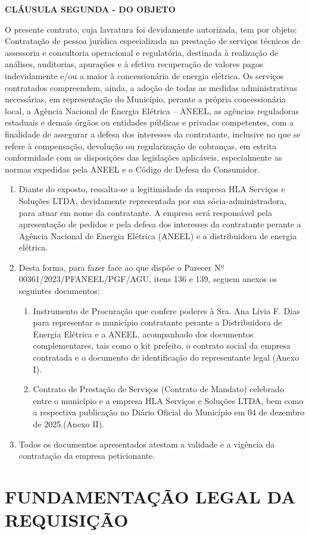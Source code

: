 \documentclass[11pt,a4paper]{article}
\newcommand{\publicacao}{Diário Oficial do Município} %
\newcommand{\dataPublicacao}{04 de dezembro de 2025} %
\newcommand{\clausula}{\textbf{CLÁUSULA SEGUNDA - DO OBJETO}

O presente contrato, cuja lavratura foi devidamente autorizada, tem por objeto: Contratação de pessoa jurídica especializada na prestação de serviços técnicos de assessoria e consultoria operacional e regulatória, destinada à realização de análises, auditorias, apurações e à efetiva recuperação de valores pagos indevidamente e/ou a maior à concessionária de energia elétrica. Os serviços contratados compreendem, ainda, a adoção de todas as medidas administrativas necessárias, em representação do Município, perante a própria concessionária local, a Agência Nacional de Energia Elétrica – ANEEL, as agências reguladoras estaduais e demais órgãos ou entidades públicas e privadas competentes, com a finalidade de assegurar a defesa dos interesses da contratante, inclusive no que se refere à compensação, devolução ou regularização de cobranças, em estrita conformidade com as disposições das legislações aplicáveis, especialmente as normas expedidas pela ANEEL e o Código de Defesa do Consumidor.}
\newcommand{\Citacao}[1]{%
  \begin{list}{}{%
    \setlength{\leftmargin}{4cm}%
    \setlength{\rightmargin}{0cm}%
    \setlength{\topsep}{\baselineskip}%
    \setlength{\partopsep}{0pt}%
    \setlength{\parsep}{0pt}%
    \setlength{\itemsep}{0pt}%
  }\item[]
  {\begingroup\scriptsize\setstretch{1}\selectfont #1\par\endgroup}
  \end{list}%
}
\begin{document}
\Citacao{\clausula{}}

\begin{enumerate}[resume]
\item
  Diante do exposto, ressalta-se a legitimidade da empresa HLA Serviços e Soluções LTDA, devidamente representada por sua sócia-administradora, para atuar em nome da contratante. A empresa será responsável pela apresentação de pedidos e pela defesa dos interesses da contratante perante a Agência Nacional de Energia Elétrica (ANEEL) e a distribuidora de energia elétrica.
\item
  Desta forma, para fazer face ao que dispõe o Parecer Nº 00361/2023/PFANEEL/PGF/AGU, itens 136 e 139, seguem anexos os seguintes documentos:

  \begin{enumerate}
  \item
   Instrumento de Procuração que confere poderes à Sra. Ana Lívia F. Dias para representar o município contratante perante a Distribuidora de Energia Elétrica e a ANEEL, acompanhado dos documentos complementares, tais como o kit prefeito, o contrato social da empresa contratada e o documento de identificação do representante legal (Anexo I).
  \item
    Contrato de Prestação de Serviços (Contrato de Mandato) celebrado entre o município e a empresa HLA Serviços e Soluções LTDA, bem como a respectiva publicação no \publicacao{} em \dataPublicacao{}.(Anexo II).  
  \end{enumerate}
\item
  Todos os documentos apresentados atestam a validade e a vigência da contratação da empresa peticionante.
\end{enumerate}

\section{FUNDAMENTAÇÃO LEGAL DA REQUISIÇÃO}
\end{document}
